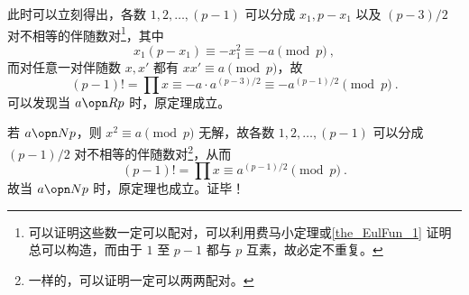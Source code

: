 此时可以立刻得出，各数 $1, 2, \dots, (p-1)$ 可以分成 $x_1, p-x_1$ 以及 $(p-3)/2$ 对不相等的伴随数对\footnote{可以证明这些数一定可以配对，可以利用费马小定理或\autoref{the_EulFun_1} 证明总可以构造，而由于 $1$ 至 $p-1$ 都与 $p$ 互素，故必定不重复。}，其中
\begin{equation}
x_1(p-x_1) \equiv -x_1^2 \equiv -a \pmod p ~,
\end{equation}
而对任意一对伴随数 $x, x'$ 都有 $xx' \equiv a \pmod p$，故
\begin{equation}
(p-1)! = \prod x \equiv -a \cdot a^{(p-3)/2} \equiv -a ^{(p-1)/2} \pmod p ~.
\end{equation}
可以发现当 $a \opn R p$ 时，原定理成立。

若 $a \opn N p$，则 $x^2 \equiv a \pmod p$ 无解，故各数 $1, 2, \dots, (p-1)$ 可以分成 $(p-1)/2$ 对不相等的伴随数对\footnote{一样的，可以证明一定可以两两配对。}，从而
\begin{equation}
(p-1)! = \prod x \equiv a^{(p-1)/2} \pmod p ~.
\end{equation}
故当 $a \opn N p$ 时，原定理也成立。证毕！